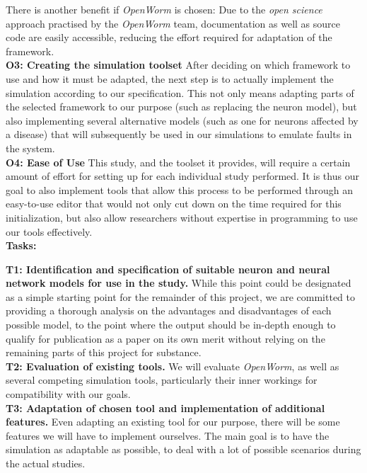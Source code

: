 \documentclass[a4paper,11pt]{article}
\begin{document}
There is another benefit if \emph{OpenWorm} is chosen: Due to the \emph{open science} approach practised by the \emph{OpenWorm} team, documentation as well as source code are easily accessible, reducing the effort required for adaptation of the framework.
\\[0.2cm]

\textbf{O3: Creating the simulation toolset}
After deciding on which framework to use and how it must be adapted, the next step is to actually implement the simulation according to our specification. This not only means adapting parts of the selected framework to our purpose (such as replacing the neuron model), but also implementing several alternative models (such as one for neurons affected by a disease) that will subsequently be used in our simulations to emulate faults in the system.
\\[0,2cm]

\textbf{O4: Ease of Use}
This study, and the toolset it provides, will require a certain amount of effort for setting up for each individual study performed. It is thus our goal to also implement tools that allow this process to be performed through an easy-to-use editor that would not only cut down on the time required for this initialization, but also allow researchers without expertise in programming to use our tools effectively. 
\\[0,2cm]

\textbf{Tasks:}

\textbf{T1: Identification and specification of suitable neuron and neural network models for use in the study.}
While this point could be designated as a simple starting point for the remainder of this project, we are committed to providing a thorough analysis on the advantages and disadvantages of each possible model, to the point where the output should be in-depth enough to qualify for publication as a paper on its own merit without relying on the remaining parts of this project for substance.
\\[0,2cm]

\textbf{T2: Evaluation of existing tools.}
We will evaluate \emph{OpenWorm}, as well as several competing simulation tools, particularly their inner workings for compatibility with our goals.
\\[0,2cm]

\textbf{T3: Adaptation of chosen tool and implementation of additional features.}
Even adapting an existing tool for our purpose, there will be some features we will have to implement ourselves. The main goal is to have the simulation as adaptable as possible, to deal with a lot of possible scenarios during the actual studies. 
\\[0,2cm]
\end{document}

